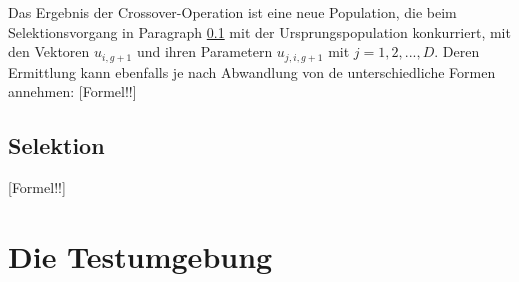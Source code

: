 			Das Ergebnis der Crossover-Operation ist eine neue Population, die 
			beim Selektionsvorgang in Paragraph \ref{sec:de-selection} mit der 
			Ursprungspopulation konkurriert, mit den Vektoren $u_{i, g+1}$ und 
			ihren Parametern $u_{j, i, g+1}$ mit $j = 1, 2, ... , D$. Deren 
			Ermittlung kann ebenfalls je nach Abwandlung von \gls{de} 
			unterschiedliche Formen annehmen:
			\color{red} [Formel!!] \color{black}
			
			
		\subsection{Selektion}
		\label{sec:de-selection}
		\color{red} [Formel!!] \color{black}
			
			
	\section{Die Testumgebung}
	\label{sec:testsetting}
